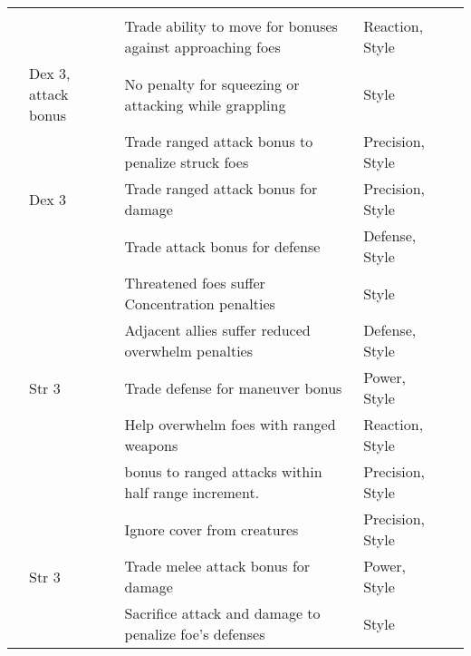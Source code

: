 {\small
    \begin{longtabu}{>{\lcol}p{10em} >{\lcol}p{15em} >{\lcol}X >{\lcol}p{6em} >{\lcol}p{3em}}
         &  &  &  &  \\
         & \x & Trade ability to move for bonuses against approaching foes & Reaction, Style &  \\
         & Dex 3, attack bonus  & No penalty for squeezing or attacking while grappling & Style &  \\
         & \x & Trade ranged attack bonus to penalize struck foes & Precision, Style &  \\
         & Dex 3 & Trade ranged attack bonus for damage & Precision, Style &  \\
         & \x & Trade attack bonus for defense & Defense, Style &  \\
         & \x & Threatened foes suffer Concentration penalties & Style &  \\
         & \x & Adjacent allies suffer reduced overwhelm penalties & Defense, Style &  \\
         & Str 3 & Trade defense for maneuver bonus & Power, Style &  \\
         & \x & Help overwhelm foes with ranged weapons & Reaction, Style &  \\
         & \x &   bonus to ranged attacks within half range increment.
        & Precision, Style &  \\
         & \x & Ignore cover from creatures & Precision, Style &  \\
         & Str 3 & Trade melee attack bonus for damage & Power, Style &  \\
         & \x & Sacrifice attack and damage to penalize foe's defenses & Style &  \\


\end{longtabu}}
